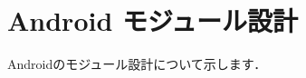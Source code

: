 \documentclass[a4j,titlepage]{jarticle}
\begin{document}
\section{Android モジュール設計}
Androidのモジュール設計について示します．

\end{document}
